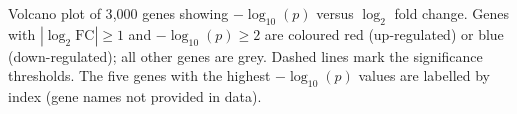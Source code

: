 \caption{Volcano plot of 3{,}000 genes showing $-\log_{10}(p)$ versus $\log_2$ fold change. Genes with $|\log_2\text{FC}| \geq 1$ and $-\log_{10}(p) \geq 2$ are coloured red (up-regulated) or blue (down-regulated); all other genes are grey. Dashed lines mark the significance thresholds. The five genes with the highest $-\log_{10}(p)$ values are labelled by index (gene names not provided in data).}
